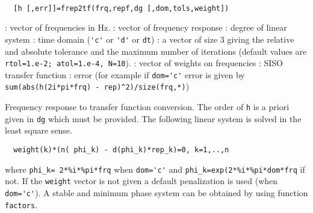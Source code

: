 \begin{mandesc}
   \\ %
\end{mandesc}
\begin{calling_sequence}
\begin{verbatim}
  [h [,err]]=frep2tf(frq,repf,dg [,dom,tols,weight])   
\end{verbatim}
\end{calling_sequence}
\begin{parameters}
  \begin{varlist}
    : vector of frequencies in Hz.
    : vector of frequency response
    : degree of linear system
    : time domain (\verb!'c'! or \verb!'d'! or \verb!dt!)
    : a vector of size 3 giving the relative and absolute tolerance
    and the maximum number of iterations (default values are
    \verb!rtol=1.e-2; atol=1.e-4, N=10!).
    : vector of weights on frequencies
    : SISO transfer function
    : error (for example if \verb!dom='c'! error is given by 
    \verb!sum(abs(h(2i*pi*frq) - rep)^2)/size(frq,*)!)
  \end{varlist}
\end{parameters}
\begin{mandescription}
  Frequency response to  transfer function conversion. The order of \verb!h!
  is a priori given in \verb!dg! which must be provided.
  The following linear system is solved in the least square sense.
\begin{verbatim}
  weight(k)*(n( phi_k) - d(phi_k)*rep_k)=0, k=1,..,n
\end{verbatim}
  where \verb!phi_k= 2*%i*%pi*frq! when \verb!dom='c'! and
  \verb!phi_k=exp(2*%i*%pi*dom*frq! if not. If the \verb!weight! vector is not
  given a default
  penalization is used (when \verb!dom='c'!).  A stable and minimum phase system
  can be obtained by using function \verb!factors!.
\end{mandescription}
